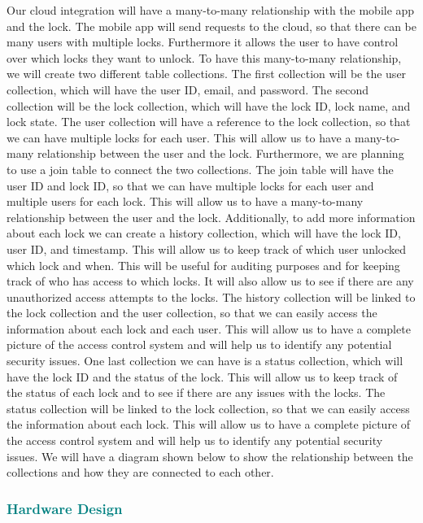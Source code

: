 Our cloud integration will have a many-to-many relationship with the mobile app and the lock. The mobile app will send requests to the cloud, so that there can be many users with multiple locks. Furthermore it allows the user to have control over which locks they want to unlock. To have this many-to-many relationship, we will create two different table collections. The first collection will be the user collection, which will have the user ID, email, and password. The second collection will be the lock collection, which will have the lock ID, lock name, and lock state. The user collection will have a reference to the lock collection, so that we can have multiple locks for each user. This will allow us to have a many-to-many relationship between the user and the lock. Furthermore, we are planning to use a join table to connect the two collections. The join table will have the user ID and lock ID, so that we can have multiple locks for each user and multiple users for each lock. This will allow us to have a many-to-many relationship between the user and the lock. Additionally, to add more information about each lock we can create a history collection, which will have the lock ID, user ID, and timestamp. This will allow us to keep track of which user unlocked which lock and when. This will be useful for auditing purposes and for keeping track of who has access to which locks. It will also allow us to see if there are any unauthorized access attempts to the locks. The history collection will be linked to the lock collection and the user collection, so that we can easily access the information about each lock and each user. This will allow us to have a complete picture of the access control system and will help us to identify any potential security issues. One last collection we can have is a status collection, which will have the lock ID and the status of the lock. This will allow us to keep track of the status of each lock and to see if there are any issues with the locks. The status collection will be linked to the lock collection, so that we can easily access the information about each lock. This will allow us to have a complete picture of the access control system and will help us to identify any potential security issues. We will have a diagram shown below to show the relationship between the collections and how they are connected to each other.


\subsubsection{\textcolor{teal}{Hardware Design}}

